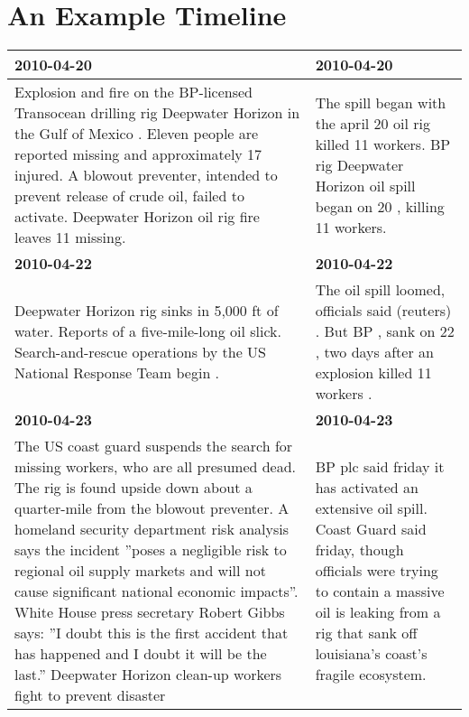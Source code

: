 \documentclass[a4paper,BCOR=10mm]{report}
\numberwithin{lemma}{chapter}
\numberwithin{definition}{chapter}
\begin{document}
\section{An Example Timeline}

\begin{table}
\begin{tabularx}{1.2\textwidth}{|X|X|}
\hline
\textbf{2010-04-20} & \textbf{2010-04-20} \\\hline
Explosion and fire on the BP-licensed Transocean drilling rig Deepwater Horizon in the Gulf of Mexico . \newline Eleven people are reported missing and approximately 17 injured. \newline A blowout preventer, intended to prevent release of crude oil, failed to activate. \newline Deepwater Horizon oil rig fire leaves 11 missing. & The spill began with the april 20 oil rig killed 11 workers. \newline BP rig Deepwater Horizon oil spill began on 20 , killing 11 workers. \\\hline
\textbf{2010-04-22} & \textbf{2010-04-22} \\\hline
Deepwater Horizon rig sinks in 5,000 ft of water. \newline Reports of a five-mile-long oil slick. \newline Search-and-rescue operations by the US National Response Team begin . & The oil spill loomed, officials said (reuters) . \newline But BP , sank on 22 , two days after an explosion killed 11 workers . \\\hline
\textbf{2010-04-23} & \textbf{2010-04-23} \\\hline
The US coast guard suspends the search for missing workers, who are all presumed dead. \newline The rig is found upside down about a quarter-mile from the blowout preventer. \newline A homeland security department risk analysis says the incident ''poses a negligible risk to regional oil supply markets and will not cause significant national economic impacts''. \newline White House press secretary Robert Gibbs says: ''I doubt this is the first accident that has happened and I doubt it will be the last.'' \newline Deepwater Horizon clean-up workers fight to prevent disaster & BP plc said friday it has activated an extensive oil spill. \newline Coast Guard said friday, though officials were trying to contain a massive oil is leaking from a rig that sank off louisiana's coast's fragile ecosystem. \\\hline

\end{tabularx}
\end{table}
\end{document}
